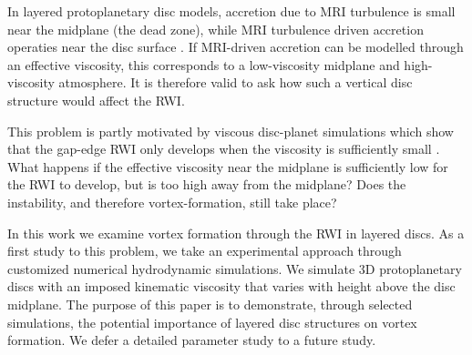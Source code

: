 \documentclass[useAMS,usenatbib]{mn2e}
\begin{document}
In layered protoplanetary disc models, accretion due to MRI turbulence
is small near the midplane (the dead zone), while MRI turbulence driven accretion
operaties near the disc surface \citep{gammie96,armitage11}. %
If MRI-driven accretion can be modelled through an effective 
viscosity, this corresponds to a low-viscosity midplane and 
high-viscosity atmosphere. It is therefore valid to ask how such a
vertical disc structure would affect the RWI. 

This problem is partly motivated by viscous disc-planet
simulations which show that the gap-edge RWI only develops when the viscosity is
sufficiently small \citep{valborro06,valborro07,edgar08}.%
What happens if the effective 
viscosity near the midplane is sufficiently low for the RWI to
develop, but is too high away from the midplane? Does the
instability, and therefore vortex-formation, still take place? 

In this work we examine vortex formation through the RWI in
layered discs. As a first study to this problem, we take an
experimental approach through customized numerical hydrodynamic
simulations. We simulate 3D protoplanetary discs with an imposed
kinematic viscosity that varies with height above the disc
midplane. %
The purpose of this paper is to demonstrate, through selected
simulations, the potential importance of layered disc structures on
vortex formation. We defer a detailed parameter study to a future
study. 
















 \appendix
% 
%
\end{document}
